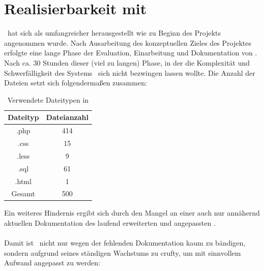 \section{Realisierbarkeit mit \getOst} \label{Realisierbarkeit mit \getOst}
\getOst\ hat sich als umfangreicher herausgestellt wie zu Beginn des Projekts angenommen wurde. Nach Ausarbeitung des konzeptuellen Zieles des Projektes erfolgte eine lange Phase der Evaluation, Einarbeitung und Dokumentation von \getOst. Nach ca. 30 Stunden dieser (viel zu langen) Phase, in der die Komplexität und Schwerfälligkeit des Systems \getOst\ sich nicht bezwingen lassen wollte. Die Anzahl der Dateien setzt sich folgendermaßen zusammen:

\begin{table}
	\centering
	\begin{tabular}{|c|c|}
		\hline 
		Dateityp	& Dateianzahl \\ 
		\hline 
		.php		& 414 \\ 
		\hline 
		.css		& 15 \\ 
		\hline 
		.less		& 9 \\ 
		\hline 
		.sql		& 61 \\ 
		\hline 
		.html		& 1 \\ 
		\hline
		\hline 
		Gesamt		& 500 \\ 
		\hline 
	\end{tabular}

	\label{tbl_ost_dateianzahl}
	\caption{Verwendete Dateitypen in \getOst}
\end{table}

Ein weiteres Hindernis ergibt sich durch den Mangel an einer auch nur annähernd aktuellen Dokumentation des laufend erweiterten und angepassten \getOst.
\paragraph{}
Damit ist \getOst\ nicht nur wegen der fehlenden Dokumentation kaum zu bändigen, sondern aufgrund seines ständigen Wachstums zu \glqq crufty\grqq , um mit sinnvollem Aufwand angepasst zu werden:

